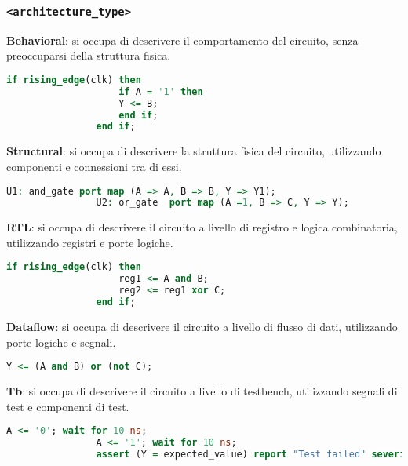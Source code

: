         \subsubsection{\texttt{<architecture\_type>}}
            \textbf{Behavioral}: si occupa di descrivere il comportamento del circuito, senza preoccuparsi della struttura fisica.
            \begin{lstlisting}[language=VHDL]
                if rising_edge(clk) then
                    if A = '1' then
                    Y <= B;
                    end if;
                end if;
            \end{lstlisting}

            \textbf{Structural}: si occupa di descrivere la struttura fisica del circuito, utilizzando componenti e connessioni tra di essi.
            \begin{lstlisting}[language=VHDL]
                U1: and_gate port map (A => A, B => B, Y => Y1);
                U2: or_gate  port map (A =1, B => C, Y => Y);
            \end{lstlisting}

            \textbf{RTL}: si occupa di descrivere il circuito a livello di registro e logica combinatoria, utilizzando registri e porte logiche.
            \begin{lstlisting}[language=VHDL]
                if rising_edge(clk) then
                    reg1 <= A and B;
                    reg2 <= reg1 xor C;
                end if;
            \end{lstlisting}

            \textbf{Dataflow}: si occupa di descrivere il circuito a livello di flusso di dati, utilizzando porte logiche e segnali.
            \begin{lstlisting}[language=VHDL]
                Y <= (A and B) or (not C);
            \end{lstlisting}

            \textbf{Tb}: si occupa di descrivere il circuito a livello di testbench, utilizzando segnali di test e componenti di test.
            \begin{lstlisting}[language=VHDL]
                A <= '0'; wait for 10 ns;
                A <= '1'; wait for 10 ns;
                assert (Y = expected_value) report "Test failed" severity error;
            \end{lstlisting}

